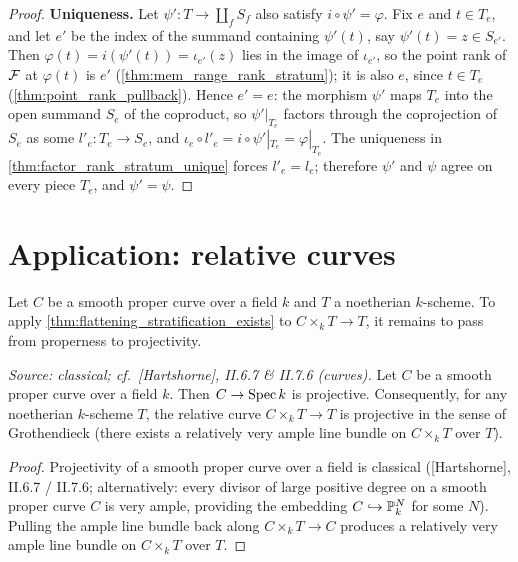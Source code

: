 \begin{proof}
  \textbf{Uniqueness.}  Let \(\psi' : T \to \coprod_f S_f\) also satisfy
  \(i \circ \psi' = \varphi\).  Fix \(e\) and \(t \in T_e\), and let
  \(e'\) be the index of the summand containing \(\psi'(t)\), say
  \(\psi'(t) = z \in S_{e'}\).  Then
  \(\varphi(t) = i(\psi'(t)) = \iota_{e'}(z)\) lies in the image of
  \(\iota_{e'}\), so the point rank of \(\mathcal{F}\) at \(\varphi(t)\) is \(e'\)
  (\cref{thm:mem_range_rank_stratum}); it is also \(e\), since
  \(t \in T_e\) (\cref{thm:point_rank_pullback}).  Hence \(e' = e\): the
  morphism \(\psi'\) maps \(T_e\) into the open summand \(S_e\) of the
  coproduct, so \(\psi'|_{T_e}\) factors through the coprojection of
  \(S_e\) as some \(l'_e : T_e \to S_e\), and
  \(\iota_e \circ l'_e = i \circ \psi'|_{T_e} = \varphi|_{T_e}\).  The
  uniqueness in \cref{thm:factor_rank_stratum_unique} forces
  \(l'_e = l_e\); therefore \(\psi'\) and \(\psi\) agree on every piece
  \(T_e\), and \(\psi' = \psi\).
\end{proof}

\section{Application: relative curves}
\label{sec:flatstrat_curve_application}

Let \(C\) be a smooth proper curve over a field \(k\) and \(T\) a noetherian
\(k\)-scheme.  To apply \cref{thm:flattening_stratification_exists} to
\(C \times_k T \to T\), it remains to pass from properness to projectivity.

\begin{lemma}
  \label{lem:smooth_proper_curve_projective}
  \textit{Source: classical; cf.\ [Hartshorne], II.6.7 \& II.7.6 (curves).}
  Let \(C\) be a smooth proper curve over a field \(k\).  Then \(C \to \operatorname{Spec} k\) is
  projective.  Consequently, for any noetherian \(k\)-scheme \(T\), the relative
  curve \(C \times_k T \to T\) is projective in the sense of Grothendieck (there
  exists a relatively very ample line bundle on \(C \times_k T\) over \(T\)).
\end{lemma}

\begin{proof}
  Projectivity of a smooth proper curve over a field is classical
  ([Hartshorne], II.6.7 / II.7.6; alternatively: every divisor of large
  positive degree on a smooth proper curve \(C\) is very ample, providing the
  embedding \(C \hookrightarrow \mathbb{P}^N_k\) for some \(N\)). Pulling the ample line
  bundle back along \(C \times_k T \to C\) produces a relatively very ample line
  bundle on \(C \times_k T\) over \(T\).
\end{proof}

